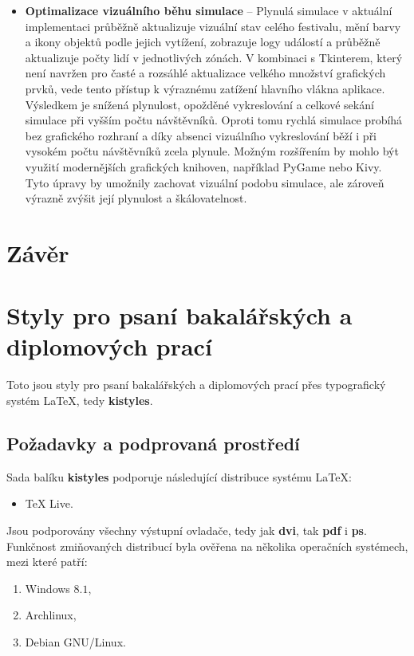 \documentclass[
  program=itp,
  biblatex,
  figures=false,
  glossaries,
  index
]{kidiplom}
\begin{document}
\begin{itemize}
\item \textbf{Optimalizace vizuálního běhu simulace} – Plynulá simulace v aktuální implementaci průběžně aktualizuje vizuální stav celého festivalu, mění barvy a ikony objektů podle jejich vytížení, zobrazuje logy událostí a průběžně aktualizuje počty lidí v jednotlivých zónách. V kombinaci s Tkinterem, který není navržen pro časté a rozsáhlé aktualizace velkého množství grafických prvků, vede tento přístup k výraznému zatížení hlavního vlákna aplikace. Výsledkem je snížená plynulost, opožděné vykreslování a celkové sekání simulace při vyšším počtu návštěvníků. Oproti tomu rychlá simulace probíhá bez grafického rozhraní a díky absenci vizuálního vykreslování běží i při vysokém počtu návštěvníků zcela plynule. Možným rozšířením by mohlo být využití modernějších grafických knihoven, například PyGame nebo Kivy. Tyto úpravy by umožnily zachovat vizuální podobu simulace, ale zároveň výrazně zvýšit její plynulost a škálovatelnost.
\end{itemize}

\section{Závěr}







\newcommand{\BibLaTeX}{\textsc{Bib}\LaTeX}


\section{Styly pro psaní bakalářských a diplomových prací}
Toto jsou styly pro psaní bakalářských a diplomových prací přes typografický systém \LaTeX{}, tedy \textbf{kistyles}.

\subsection{Požadavky a podprovaná prostředí}
Sada balíku \textbf{kistyles} podporuje následující distribuce systému \LaTeX{}:
\begin{itemize}
\item \TeX{} Live.
\end{itemize}

Jsou podporovány všechny výstupní ovladače, tedy jak \textbf{dvi}, tak \textbf{pdf} i \textbf{ps}. Funkčnost zmiňovaných distribucí byla ověřena na několika operačních systémech, mezi které patří:
\begin{enumerate}
\item Windows $8.1$,
\item Archlinux,
\item Debian GNU/Linux.
\end{enumerate}
\end{document}
